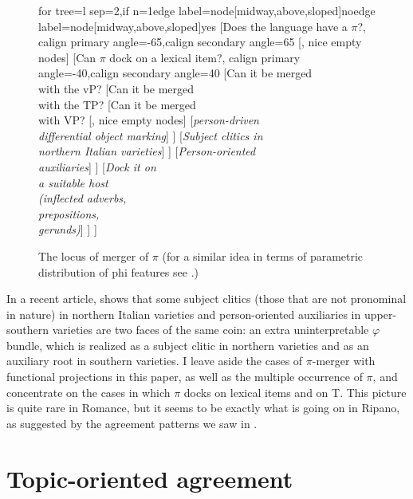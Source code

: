 \documentclass[output=paper
,modfonts
,nonflat]{langsci/langscibook}
\begin{document}
\begin{figure}[h]
\caption{\label{ex-dalessandro:20} The locus of merger of $\pi$ (for a similar idea in terms of parametric distribution of phi features see \citealt{Van_der_WalTA}.)}
	\begin{forest} for tree={l sep=2\baselineskip,if n=1{edge label={node[midway,above,sloped]{no}}}{edge label={node[midway,above,sloped]{yes}}}}
	[Does the language have a $\pi$?, calign primary angle=-65,calign secondary angle=65
	[, nice empty nodes]
	[Can $\pi$ dock on a lexical item?, calign primary angle=-40,calign secondary angle=40
	[Can it be merged\\ with the vP?
	[Can it be merged\\ with the TP?
	[Can it be merged\\ with VP?
	[, nice empty nodes]
	[\textit{person-driven}\\ \textit{differential object marking}] ]
	[\textit{Subject clitics in}\\ \textit{northern Italian varieties}] ]
	[\textit{Person-oriented} \\ \textit{auxiliaries}] ]
	[\textit{Dock it on}\\ \textit{a suitable host}\\ \textit{(inflected adverbs,}\\ \textit{prepositions,}\\ \textit{gerunds)}] ]	
	] 
	\end{forest}
\end{figure}

In a recent article, \citet{D`Alessandro2017} shows that some subject clitics (those that are not pronominal in nature) in northern Italian varieties and person-ori\-ent\-ed auxiliaries in upper-southern varieties are two faces of the same coin: an extra uninterpretable $\varphi$ bundle, which is realized as a subject clitic in northern varieties and as an auxiliary root in southern varieties. I leave aside the cases of $\pi $-merger with functional projections in this paper, as well as the multiple occurrence of $\pi$, and concentrate on the cases in which $\pi$ docks on lexical items and on T. This picture is quite rare in Romance, but it seems to be exactly what is going on in Ripano, as suggested by the agreement patterns we saw in .

\section{Topic-oriented agreement}\label{sec-dalessandro:4}
\end{document}
